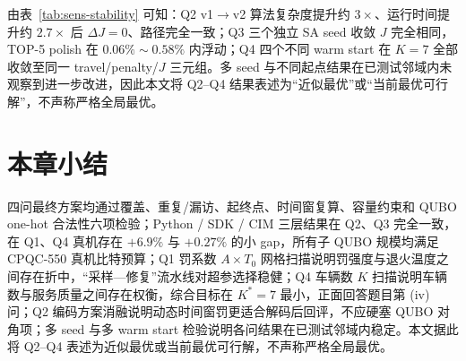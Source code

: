 \documentclass[UTF8,12pt,a4paper]{ctexart}
\begin{document}
由表~\ref{tab:sens-stability} 可知：Q2 v1$\to$v2 算法复杂度提升约 $3\times$、运行时间提升约 $2.7\times$ 后 $\Delta J\!=\!0$、路径完全一致；Q3 三个独立 SA seed 收敛 $J$ 完全相同，TOP-5 polish 在 $0.06\%\!\sim\!0.58\%$ 内浮动；Q4 四个不同 warm start 在 $K\!=\!7$ 全部收敛至同一 travel/penalty/$J$ 三元组。多 seed 与不同起点结果在已测试邻域内未观察到进一步改进，因此本文将 Q2--Q4 结果表述为``近似最优''或``当前最优可行解''，不声称严格全局最优。

\section{本章小结}

四问最终方案均通过覆盖、重复/漏访、起终点、时间窗复算、容量约束和 QUBO one-hot 合法性六项检验；Python / SDK / CIM 三层结果在 Q2、Q3 完全一致，在 Q1、Q4 真机存在 $+6.9\%$ 与 $+0.27\%$ 的小 gap，所有子 QUBO 规模均满足 CPQC-550 真机比特预算；Q1 罚系数 $A\!\times\!T_0$ 网格扫描说明罚强度与退火温度之间存在折中，``采样—修复''流水线对超参选择稳健；Q4 车辆数 $K$ 扫描说明车辆数与服务质量之间存在权衡，综合目标在 $K^*\!=\!7$ 最小，正面回答题目第 (iv) 问；Q2 编码方案消融说明动态时间窗罚更适合解码后回评，不应硬塞 QUBO 对角项；多 seed 与多 warm start 检验说明各问结果在已测试邻域内稳定。本文据此将 Q2--Q4 表述为近似最优或当前最优可行解，不声称严格全局最优。
\end{document}
